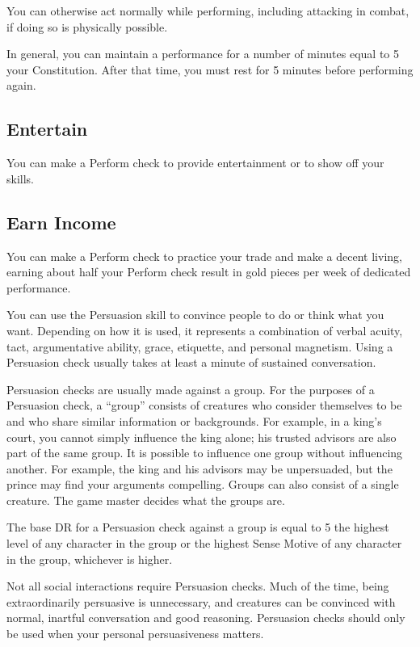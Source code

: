         You can otherwise act normally while performing, including attacking in combat, if doing so is physically possible.

        In general, you can maintain a performance for a number of minutes equal to 5 \add your Constitution.
        After that time, you must rest for 5 minutes before performing again.

    \subsection{Entertain}
        You can make a Perform check to provide entertainment or to show off your skills.

    \subsection{Earn Income}
        You can make a Perform check to practice your trade and make a decent living, earning about half your Perform check result in gold pieces per week of dedicated performance.

\newpage
{}
        You can use the Persuasion skill to convince people to do or think what you want. Depending on how it is used, it represents a combination of verbal acuity, tact, argumentative ability, grace, etiquette, and personal magnetism. Using a Persuasion check usually takes at least a minute of sustained conversation.

        Persuasion checks are usually made against a group. For the purposes of a Persuasion check, a ``group'' consists of creatures who consider themselves to be  and who share similar information or backgrounds. For example, in a king's court, you cannot simply influence the king alone; his trusted advisors are also part of the same group. It is possible to influence one group without influencing another. For example, the king and his advisors may be unpersuaded, but the prince may find your arguments compelling. Groups can also consist of a single creature. The game master decides what the groups are.

        The base DR for a Persuasion check against a group is equal to 5 \add the highest level of any character in the group or the highest Sense Motive of any character in the group, whichever is higher.

        Not all social interactions require Persuasion checks. Much of the time, being extraordinarily persuasive is unnecessary, and creatures can be convinced with normal, inartful conversation and good reasoning. Persuasion checks should only be used when your personal persuasiveness matters.


